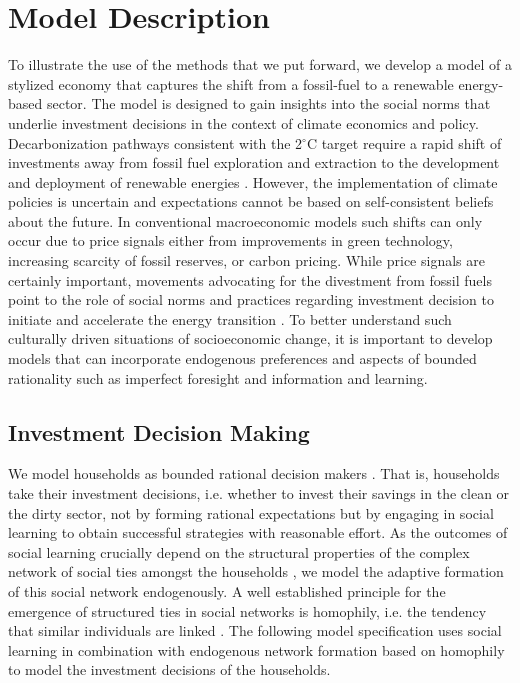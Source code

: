 \section{Model Description}
\label{sec:Model_Description}

To illustrate the use of the methods that we put forward, we develop a model of a stylized economy that captures the shift from a fossil-fuel to a renewable energy-based sector.
The model is designed to gain insights into the social norms that underlie investment decisions in the context of climate economics and policy.
Decarbonization pathways consistent with the 2$^{\circ}$C target require a rapid shift of investments away from fossil fuel exploration and extraction to the development and deployment of renewable energies \citep{IPCC2014}.
However, the implementation of climate policies is uncertain and expectations cannot be based on self-consistent beliefs about the future. 
In conventional macroeconomic models such shifts can only occur due to price signals either from improvements in green technology, increasing scarcity of fossil reserves, or carbon pricing.
While price signals are certainly important, movements advocating for the divestment from fossil fuels point to the role of social norms and practices regarding investment decision to initiate and accelerate the energy transition \citep{Ans2013}.
To better understand such culturally driven situations of socioeconomic change, it is important to develop models that can incorporate endogenous preferences and aspects of bounded rationality such as imperfect foresight and information and learning.



\subsection{Investment Decision Making}
\label{sec:investment_decision_making_descr.}

We model households as bounded rational decision makers \cite{simon1972theories, simon1982models, gigerenzer2002bounded}.
That is, households take their investment decisions, i.e. whether to invest their savings in the clean or the dirty sector, not by forming rational expectations \cite{Evans2006, Kirman2014} but by engaging in social learning \cite{Bandura1971} to obtain successful strategies \cite{Traulsen2010} with reasonable effort.
As the outcomes of social learning crucially depend on the structural properties of the complex network of social ties amongst the households \cite{Barkoczi2016}, we model the adaptive formation of this social network endogenously.
A well established principle for the emergence of structured ties in social networks is homophily, i.e. the tendency that similar individuals are linked \cite{McPherson2007, Centola2007, Centola2011}.
The following model specification uses social learning in combination with endogenous network formation based on homophily to model the investment decisions of the households.

